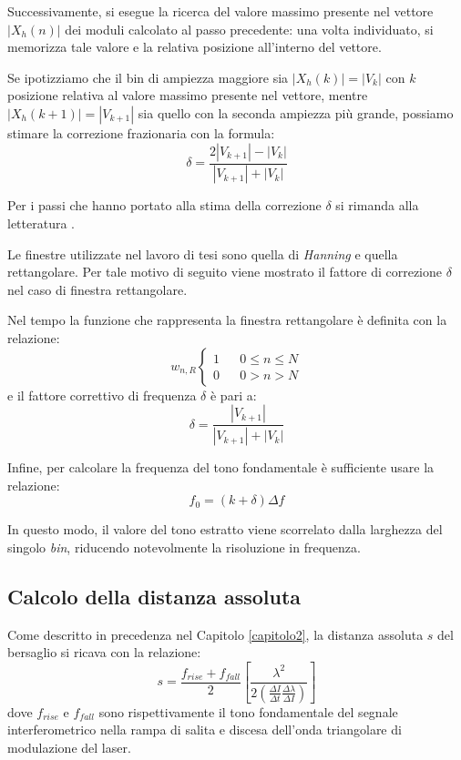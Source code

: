 Successivamente, si esegue la ricerca del valore massimo presente nel vettore $|X_h(n)|$ dei moduli calcolato al passo precedente: una volta individuato, si memorizza tale valore e la relativa posizione all'interno del vettore.

Se ipotizziamo che il bin di ampiezza maggiore sia $|X_h(k)|=|V_k|$ con $k$ posizione relativa al valore massimo presente nel vettore, mentre $|X_h(k+1)|=|V_{k+1}|$ sia quello con la seconda ampiezza più grande, possiamo stimare la correzione frazionaria  con la formula:
\begin{equation}
	\delta = \frac{2 |V_{k+1}|- |V_k|}{|V_{k+1}| + |V_k|}
\end{equation}

Per i passi che hanno portato alla stima della correzione $\delta$ si rimanda alla letteratura \cite{1007077}.

Le finestre utilizzate nel lavoro di tesi sono quella di \textit{Hanning} e quella rettangolare. Per tale motivo di seguito viene mostrato il fattore di correzione $\delta$ nel caso di finestra rettangolare.

Nel tempo la funzione che rappresenta la finestra rettangolare è definita con la relazione: 
\begin{equation}
w_{n,R}
\left\{\begin{matrix}
1 & & 0 \leq n \leq N \\ 
0  &  & 0 > n > N
\end{matrix}\right.
\end{equation}
e il fattore correttivo di frequenza $\delta$ è pari a:
\begin{equation}
	\delta = \frac{|V_{k+1}|}{|V_{k+1}| + |V_k|}
\end{equation}

Infine, per calcolare la frequenza del tono fondamentale è sufficiente usare la relazione: 
\begin{equation}
	f_0 = (k + \delta)\Delta f
\end{equation}

In questo modo, il valore del tono estratto viene scorrelato dalla larghezza del singolo \textit{bin}, riducendo notevolmente la risoluzione in frequenza. 

\subsection{Calcolo della distanza assoluta}
Come descritto in precedenza nel Capitolo \ref{capitolo2}, la distanza assoluta $s$ del bersaglio si ricava con la relazione:
\begin{equation}
	s = \frac{f_{rise}+f_{fall}}{2} \left [ \frac{\lambda^2}{2\left ( \frac{\Delta I}{\Delta t} \frac{\Delta \lambda}{\Delta I} \right )}  \right ]
\end{equation}
dove $f_{rise}$ e $f_{fall}$ sono rispettivamente il tono fondamentale del segnale interferometrico nella rampa di salita e discesa dell'onda triangolare di modulazione del laser.
